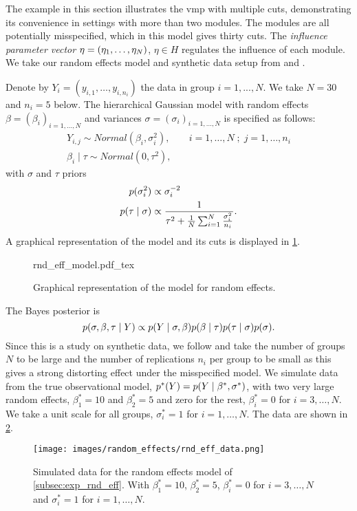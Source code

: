 The example in this section illustrates the \acrshort*{vmp} with multiple cuts, demonstrating its convenience in settings with more than two modules. The modules are all potentially misspecified, which in this model gives thirty cuts.
The \emph{influence parameter vector} ${}{\eta}=(\eta_1,\ldots,\eta_{N})$, $\eta\in H$ regulates the influence of each module.
We take our random effects model and synthetic data setup from \cite{Liu2009modularization} and \cite{Jacob2017together}.

Denote by $Y_i=(y_{i,1}, \ldots, y_{i,n_i})$ the data in group $i=1,...,N$.  We take $N=30$ and $n_i=5$ below. The hierarchical Gaussian model with random effects $\beta=(\beta_i)_{i=1,...,N}$ and variances $\sigma=(\sigma_i)_{i=1,...,N}$ is specified as follows:
\begin{align*}
  Y_{i,j} \sim Normal( \beta_{i}, \sigma_{i}^2 ), & \quad i=1,\ldots,N \; ; \; j=1,\ldots,n_i \\
  \beta_{i} \mid \tau \sim Normal( 0, \tau^2 ),   &
\end{align*}
with $\sigma$ and $\tau$ priors
\begin{align*}
  p(\sigma_{i}^2)            & \propto \sigma_{i}^{-2}                                                          \\
  p(\tau \mid {}{\sigma} ) & \propto \frac{1}{\tau^2 + \frac{1}{N} \sum_{i=1}^{N} \frac{\sigma_{i}^2}{n_i} }.
\end{align*}
A graphical representation of the model and its cuts is displayed in \cref{fig:rnd_eff_model}.
\begin{figure}[!htb]
  \centering
  \def\svgwidth{0.4\textwidth}
  {rnd_eff_model.pdf_tex}
  \caption{Graphical representation of the model for random effects.}
  \label{fig:rnd_eff_model}
\end{figure}
The Bayes posterior is
\[
  p({}{\sigma},{}{\beta},\tau \mid Y) \propto p(Y \mid {}{\sigma},{}{\beta})p({}{\beta} \mid \tau)p(\tau \mid {}{\sigma}) p({}{\sigma}).
\]
Since this is a study on synthetic data, we follow \cite{Liu2009modularization} and take the number of groups $N$ to be large and the number of replications $n_i$ per group to be small as this gives a strong distorting effect under the misspecified model.
We simulate data from the true observational model, $p^*(Y)=p(Y\mid {}{\beta^*},{}{\sigma^*})$, with two very large random effects, $\beta^*_1=10$ and $\beta^*_2=5$ and zero for the rest, $\beta^*_i=0$ for $i=3,\ldots,N$. We take a unit scale for all groups, $\sigma^*_i=1$ for $i=1,\ldots,N$.
The data are shown in \cref{fig:rnd_eff_data}.
\begin{figure}[!htb]
  \centering
  \texttt{[image: images/random\_effects/rnd\_eff\_data.png]}
  \caption[Random effect data]{Simulated data for the random effects model of \cref{subsec:exp_rnd_eff}. With $\beta_1^*=10$, $\beta_2^*=5$, $\beta^*_i=0$ for $i=3,\ldots,N$ and $\sigma^*_i=1$ for $i=1,\ldots,N$.}
  \label{fig:rnd_eff_data}
\end{figure}

